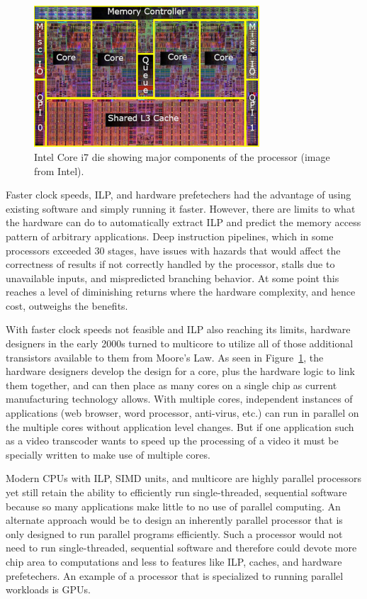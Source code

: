 \documentclass{JINST}
\begin{document}
\begin{figure}[!Hhtb]
\begin{center}
\includegraphics[width=0.75\textwidth]{figs/Core_i7_die.pdf}
\caption{Intel Core i7 die showing major components of the processor (image from Intel). \label{fig:core_i7_die}}
\end{center}
\end{figure}

Faster clock speeds, ILP, and hardware prefetechers had the advantage of using existing software and simply running it faster.  However, there are limits to what the hardware can do to automatically extract ILP and predict the memory access pattern of arbitrary applications.  Deep instruction pipelines, which in some processors exceeded 30 stages, have issues with hazards that would affect the correctness of results if not correctly handled by the processor, stalls due to unavailable inputs, and mispredicted branching behavior.  At some point this reaches a level of diminishing returns where the hardware complexity, and hence cost, outweighs the benefits.

With faster clock speeds not feasible and ILP also reaching its limits, hardware designers in the early 2000s turned to multicore to utilize all of those additional transistors available to them from Moore's Law.  As seen in Figure~\ref{fig:core_i7_die}, the hardware designers develop the design for a core, plus the hardware logic to link them together, and can then place as many cores on a single chip as current manufacturing technology allows.  With multiple cores, independent instances of applications (web browser, word processor, anti-virus, etc.) can run in parallel on the multiple cores without application level changes.  But if one application such as a video transcoder wants to speed up the processing of a video it must be specially written to make use of multiple cores.

Modern CPUs with ILP, SIMD units, and multicore are highly parallel processors yet still retain the ability to efficiently run single-threaded, sequential software because so many applications make little to no use of parallel computing.  An alternate approach would be to design an inherently parallel processor that is only designed to run parallel programs efficiently.  Such a processor would not need to run single-threaded, sequential software and therefore could devote more chip area to computations and less to features like ILP, caches, and hardware prefetechers.  An example of a processor that is specialized to running parallel workloads is GPUs.
\end{document}
